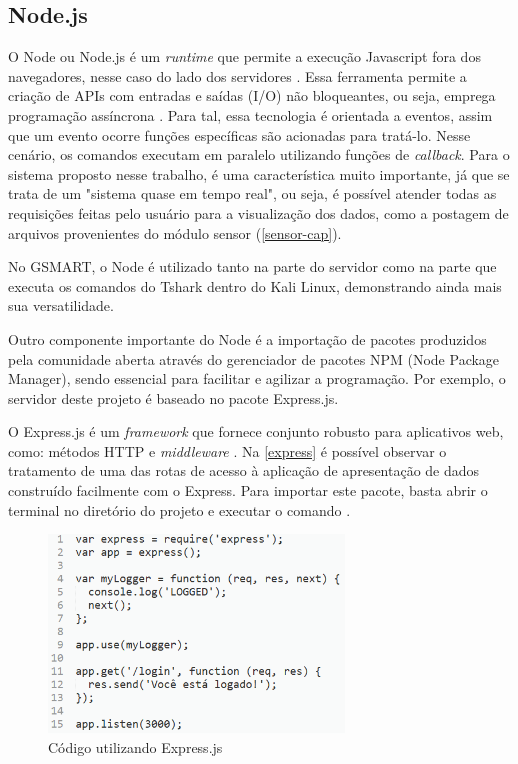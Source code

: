 \subsection{Node.js}
O Node ou Node.js é um \emph{runtime} que permite a execução Javascript fora dos navegadores, nesse caso do lado dos servidores \cite{node}.
Essa ferramenta permite a criação de APIs com entradas e saídas (I/O) não bloqueantes, ou seja, emprega programação assíncrona \cite{Dzone}. Para tal, essa tecnologia é orientada a eventos, assim que um evento ocorre funções específicas são
acionadas para tratá-lo. Nesse cenário, os comandos executam em paralelo utilizando funções de \emph{callback}. Para o sistema proposto nesse trabalho, é uma característica muito importante, já que se trata de um "sistema quase em tempo real", ou seja, é possível atender todas as requisições feitas pelo usuário para a visualização dos dados, como
a postagem de arquivos provenientes do módulo sensor (\autoref{sensor-cap}).

No GSMART, o Node é utilizado tanto na parte do servidor como na parte que executa os comandos do Tshark dentro do Kali Linux, demonstrando ainda mais sua versatilidade.

Outro componente importante do Node é a importação de pacotes produzidos pela comunidade aberta através do gerenciador de pacotes NPM (Node
Package Manager), sendo essencial para facilitar e agilizar a programação. Por exemplo, o servidor deste projeto é baseado no pacote Express.js.

O Express.js é um \emph{framework} que fornece conjunto robusto para aplicativos web, como: métodos HTTP e \emph{middleware} \cite{express}. Na \autoref{express} é possível observar o tratamento de uma das rotas de acesso à aplicação de apresentação de dados construído facilmente com o Express. Para importar este pacote, basta abrir o terminal no diretório do projeto e executar o comando .

\begin{figure}[htb]
  \caption{\label{express}Código utilizando Express.js}
  \begin{center}
    \includegraphics[width=0.70\textwidth]{img/express.png}
  \end{center}
\end{figure}

